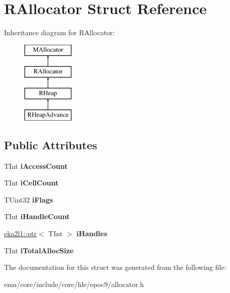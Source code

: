 \hypertarget{struct_r_allocator}{}\section{R\+Allocator Struct Reference}
\label{struct_r_allocator}
Inheritance diagram for R\+Allocator\+:\begin{figure}[H]
\begin{center}
\leavevmode
\includegraphics[height=4.000000cm]{struct_r_allocator}
\end{center}
\end{figure}
\subsection*{Public Attributes}
\begin{DoxyCompactItemize}
\item 
\mbox{\label{struct_r_allocator_a26157475671d5ebc9be363f5cf2e0fec}} 
T\+Int {\bfseries i\+Access\+Count}
\item 
\mbox{\label{struct_r_allocator_abe64005cddf367a264ae9b7d034d511e}} 
T\+Int {\bfseries i\+Cell\+Count}
\item 
\mbox{\label{struct_r_allocator_adb68405c77a89bea5419a8dcd0b9492f}} 
T\+Uint32 {\bfseries i\+Flags}
\item 
\mbox{\label{struct_r_allocator_ac4379e7dd6d89dd82381bb09007d7be0}} 
T\+Int {\bfseries i\+Handle\+Count}
\item 
\mbox{\label{struct_r_allocator_ae104abeec5535c3bb3489e41ab0418fb}} 
\mbox{\hyperlink{classeka2l1_1_1ptr}{eka2l1\+::ptr}}$<$ T\+Int $>$ {\bfseries i\+Handles}
\item 
\mbox{\label{struct_r_allocator_a52cb3bd05a82b55488d5a150ffbfa576}} 
T\+Int {\bfseries i\+Total\+Alloc\+Size}
\end{DoxyCompactItemize}


The documentation for this struct was generated from the following file\+:\begin{DoxyCompactItemize}
\item 
emu/core/include/core/hle/epoc9/allocator.\+h\end{DoxyCompactItemize}
